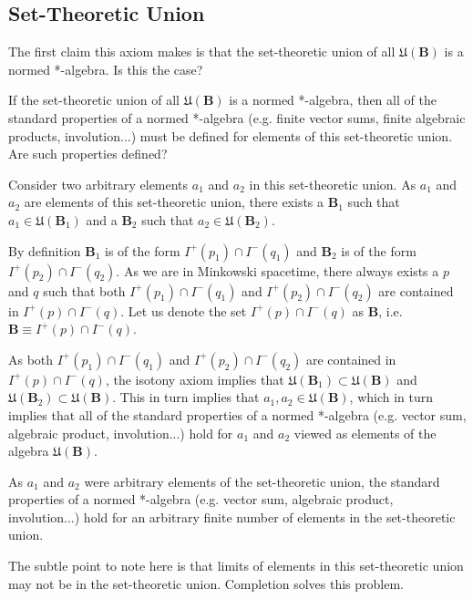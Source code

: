 \subsection{Set-Theoretic Union}\label{subsec:set-theoretic-union}
The first claim this axiom makes is that the set-theoretic union of all $\mathfrak{U}(\mathbf{B})$ is a normed *-algebra. Is this the case?

If the set-theoretic union of all $\mathfrak{U}(\mathbf{B})$ is a normed *-algebra, then all of the standard properties of a normed *-algebra (e.g. finite vector sums, finite algebraic products, involution...) must be defined for elements of this set-theoretic union. Are such properties defined?

Consider two arbitrary elements $a_1$ and $a_2$ in this set-theoretic union. As $a_1$ and $a_2$ are elements of this set-theoretic union, there exists a $\mathbf{B}_1$ such that $a_1 \in \mathfrak{U}(\mathbf{B}_1)$ and a $\mathbf{B}_2$ such that $a_2 \in \mathfrak{U}(\mathbf{B}_2)$.

By definition $\mathbf{B}_1$ is of the form $I^+(p_1) \cap I^-(q_1)$ and $\mathbf{B}_2$ is of the form $I^+(p_2) \cap I^-(q_2)$. As we are in Minkowski spacetime, there always exists a $p$ and $q$ such that both  $I^+(p_1) \cap I^-(q_1)$ and $I^+(p_2) \cap I^-(q_2)$ are contained in $I^+(p) \cap I^-(q)$. Let us denote the set $I^+(p) \cap I^-(q)$ as $\mathbf{B}$, i.e. $\mathbf{B} \equiv I^+(p) \cap I^-(q)$.

As both $I^+(p_1) \cap I^-(q_1)$ and $I^+(p_2) \cap I^-(q_2)$ are contained in $I^+(p) \cap I^-(q)$, the isotony axiom implies that $\mathfrak{U}(\mathbf{B}_1) \subset \mathfrak{U}(\mathbf{B})$ and $\mathfrak{U}(\mathbf{B}_2) \subset \mathfrak{U}(\mathbf{B})$. This in turn implies that $a_1, a_2 \in \mathfrak{U}(\mathbf{B})$, which in turn implies that all of the standard properties of a normed *-algebra (e.g. vector sum, algebraic product, involution...) hold for $a_1$ and $a_2$ viewed as elements of the algebra $\mathfrak{U}(\mathbf{B})$.

As $a_1$ and $a_2$ were arbitrary elements of the set-theoretic union, the standard properties of a normed *-algebra (e.g. vector sum, algebraic product, involution...) hold for an arbitrary finite number of elements in the set-theoretic union.

The subtle point to note here is that limits of elements in this set-theoretic union may not be in the set-theoretic union. Completion solves this problem.
